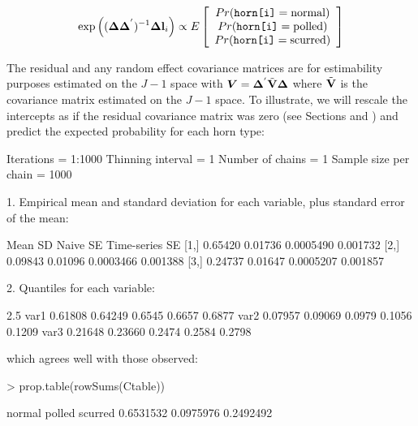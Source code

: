 \documentclass{article}
\begin{document}
\begin{equation}
\textrm{exp}\left(({\bm \Delta}{\bm \Delta}^{'})^{-1}{\bm \Delta}{\bf l}_{i}\right) \propto E\left[\begin{array}{c} Pr(\texttt{horn[i]}=\textrm{normal})\\ Pr(\texttt{horn[i]}=\textrm{polled})\\ Pr(\texttt{horn[i]}=\textrm{scurred}) \end{array} \right]
\end{equation}

The residual and any random effect covariance matrices are for estimability purposes estimated on the $J-1$ space with  ${\bm V}={\bm \Delta}^{'}\tilde{\bf V}{\bm \Delta}$ where $\tilde{\bf V}$ is the covariance matrix estimated on the $J-1$ space. To illustrate, we will rescale the intercepts as if the residual covariance matrix was zero (see Sections and \label{pred-sec} \label{cat-sec}) and predict the expected probability for each horn type:

\begin{Schunk}
\begin{Soutput}
Iterations = 1:1000
Thinning interval = 1 
Number of chains = 1 
Sample size per chain = 1000 

1. Empirical mean and standard deviation for each variable,
   plus standard error of the mean:

        Mean      SD  Naive SE Time-series SE
[1,] 0.65420 0.01736 0.0005490       0.001732
[2,] 0.09843 0.01096 0.0003466       0.001388
[3,] 0.24737 0.01647 0.0005207       0.001857

2. Quantiles for each variable:

        2.5%
var1 0.61808 0.64249 0.6545 0.6657 0.6877
var2 0.07957 0.09069 0.0979 0.1056 0.1209
var3 0.21648 0.23660 0.2474 0.2584 0.2798
\end{Soutput}
\end{Schunk}

which agrees well with those observed:

\begin{Schunk}
\begin{Sinput}
> prop.table(rowSums(Ctable))
\end{Sinput}
\begin{Soutput}
   normal    polled   scurred 
0.6531532 0.0975976 0.2492492 
\end{Soutput}
\end{Schunk}
\end{document}
